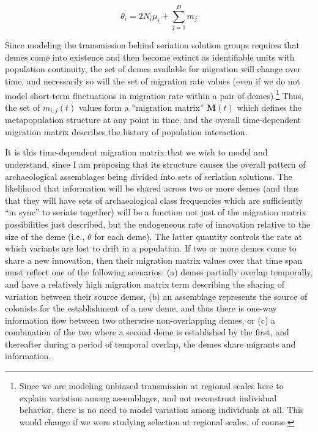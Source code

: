 \begin{equation}
\label{eq:demic-innovation-rate}
\theta_i = 2N_i \mu_i + \sum_{j=1}^D m_j
\end{equation}

Since modeling the transmission behind seriation solution groups requires that demes come into existence and then become extinct as identifiable units with population continuity, the set of demes available for migration will change over time, and necessarily so will the set of migration rate values (even if we do not model short-term fluctuations in migration rate within a pair of demes).\footnote{Since we are modeling unbiased transmission at regional scales here to explain variation among assemblages, and not reconstruct individual behavior, there is no need to model variation among individuals at all.  This would change if we were studying selection at regional scales, of course.}   Thus, the set of $m_{i,j}(t)$ values form a ``migration matrix'' $\mathbf{M}(t)$ which defines the metapopulation structure at any point in time, and the overall time-dependent migration matrix describes the history of population interaction. 

It is this time-dependent migration matrix that we wish to model and understand, since I am proposing that its structure causes the overall pattern of archaeological assemblages being divided into sets of seriation solutions.  The likelihood that information will be shared across two or more demes (and thus that they will have sets of archaeological class frequencies which are sufficiently ``in sync'' to seriate together) will be a function not just of the migration matrix possibilities just described, but the endogeneous rate of innovation relative to the size of the deme (i.e., $\theta$ for each deme).  The latter quantity controls the rate at which variants are lost to drift in a population.  If two or more demes come to share a new innovation, then their migration matrix values over that time span must reflect one of the following scenarios: (a) demes partially overlap temporally, and have a relatively high migration matrix term describing the sharing of variation between their source demes, (b) an assemblage represents the source of colonists for the establishment of a new deme, and thus there is one-way information flow between two otherwise non-overlapping demes, or (c) a combination of the two where a second deme is established by the first, and thereafter during a period of temporal overlap, the demes share migrants and information.  





